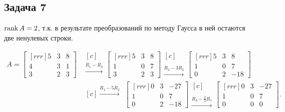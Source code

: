 \documentclass[a4paper,11pt]{article}
\begin{document}
\subsection{Задача 7}

$\rank{A} = 2$, т.к. в результате преобразований по методу Гаусса в ней остаются две ненулевых строки.

\begin{align*}
A =
\begin{bmatrix}[rrr]
   5 &  3 &  8 \\
   4 &  3 &  1 \\
   3 &  2 &  3
\end{bmatrix}
& \begin{matrix}[c] ~ \\ \xrightarrow{R_1-R_2} \\ ~ \end{matrix}
\begin{bmatrix}[rrr]
   5 &  3 &  8 \\
   1 &  0 &  7 \\
   3 &  2 &  3
\end{bmatrix}
\begin{matrix}[c] ~ \\ ~ \\ \xrightarrow{R_3-3R_2} \end{matrix}
\begin{bmatrix}[rrr]
   5 &  3 &   8 \\
   1 &  0 &   7 \\
   0 &  2 & -18
\end{bmatrix}
\\
& \begin{matrix}[c] \xrightarrow{R_1-5R_2} \\ ~ \\ ~ \end{matrix}
\begin{bmatrix}[rrr]
   0 &  3 & -27 \\
   1 &  0 &   7 \\
   0 &  2 & -18
\end{bmatrix}
\begin{matrix}[c] ~ \\ ~ \\ \xrightarrow{R_3-\frac{2}{3}R_1} \end{matrix}
\begin{bmatrix}[rrr]
   0 &  3 & -27 \\
   1 &  0 &   7 \\
   0 &  0 &   0
\end{bmatrix}.
\end{align*}
\end{document}
